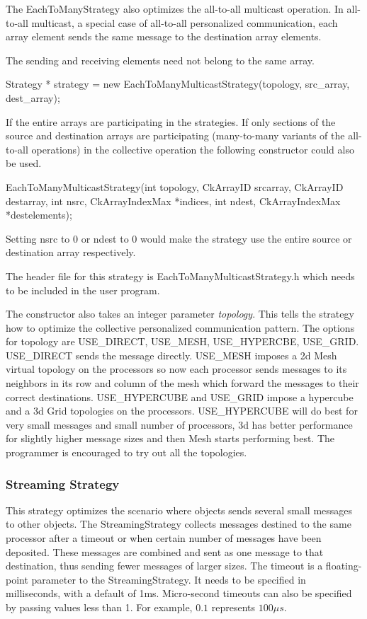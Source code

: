 The EachToManyStrategy also optimizes the all-to-all multicast operation. In all-to-all 
multicast, a special case of all-to-all personalized communication, each array 
element sends the same message to the destination array elements.

The sending and receiving elements need not belong to
the same array.  

Strategy * strategy = new EachToManyMulticastStrategy(topology,
src\_array, dest\_array);

If the entire arrays are participating in the strategies. If only
sections of the source and destination arrays are participating (many-to-many variants of the 
all-to-all operations) in the collective operation the following constructor could also be used.

EachToManyMulticastStrategy(int topology, CkArrayID srcarray, CkArrayID destarray,
int nsrc, 
CkArrayIndexMax *indices, int ndest, 
CkArrayIndexMax  *destelements);

Setting nsrc to 0 or ndest to 0 would make the strategy use the entire
source or destination array respectively.

The header file for this strategy is EachToManyMulticastStrategy.h
which needs to be included in the user program.

The constructor also takes an integer parameter {\em topology}. This
tells the strategy how to optimize the collective personalized
communication pattern. The options for topology are USE\_DIRECT,
USE\_MESH, USE\_HYPERCBE, USE\_GRID. USE\_DIRECT sends the message
directly. USE\_MESH imposes a 2d Mesh virtual topology on the
processors so now each processor sends messages to its neighbors in
its row and column of the mesh which forward the messages to their
correct destinations. USE\_HYPERCUBE and USE\_GRID impose a hypercube
and a 3d Grid topologies on the processors. USE\_HYPERCUBE will do
best for very small messages and small number of processors, 3d has
better performance for slightly higher message sizes and then Mesh
starts performing best. The programmer is encouraged to try out all
the topologies.


\subsubsection{Streaming Strategy}

\label{sec:streaming_strategy}

This strategy optimizes the scenario where objects sends several small
messages to other objects. The StreamingStrategy collects messages
destined to the same processor after a timeout or when certain number
of messages have been deposited. These messages are combined and sent
as one message to that destination, thus sending fewer messages of
larger sizes. The timeout is a floating-point parameter to the
StreamingStrategy. It needs to be specified in milliseconds, with a
default of 1ms. Micro-second timeouts can also be specified by passing
values less than 1. For example, $0.1$ represents $100\mu s$.

